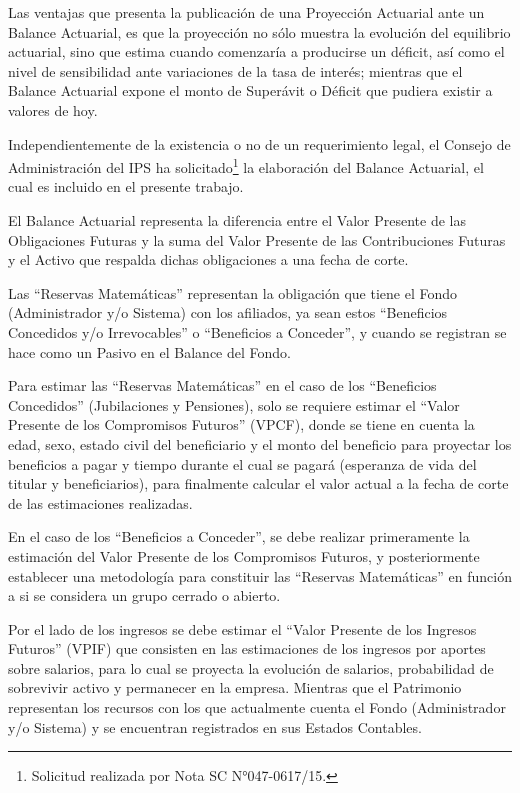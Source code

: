 \documentclass[a4paper,11pt]{article}
\begin{document}
Las ventajas que presenta la publicación de una Proyección Actuarial ante un Balance Actuarial, es que la proyección no sólo muestra la evolución del equilibrio actuarial, sino que estima cuando comenzaría a producirse un déficit, así como el nivel de sensibilidad ante variaciones de la tasa de interés; mientras que el Balance Actuarial expone el monto de Superávit o Déficit que pudiera existir a valores de hoy.

Independientemente de la existencia o no de un requerimiento legal, el Consejo de Administración del IPS ha solicitado\footnote{Solicitud realizada por Nota SC N°047-0617/15.}  la elaboración del Balance Actuarial, el cual es incluido en el presente trabajo.

El Balance Actuarial representa la diferencia entre el Valor Presente de las Obligaciones Futuras y la suma del Valor Presente de las Contribuciones Futuras y el Activo que respalda dichas obligaciones a una fecha de corte.  

Las “Reservas Matemáticas” representan la obligación que tiene el Fondo (Administrador y/o Sistema) con los afiliados, ya sean estos “Beneficios Concedidos y/o Irrevocables” o “Beneficios a Conceder”, y cuando se registran se hace como un Pasivo en el Balance del Fondo. 

Para estimar las “Reservas Matemáticas” en el caso de los “Beneficios Concedidos” (Jubilaciones y Pensiones), solo se requiere estimar el “Valor Presente de los Compromisos Futuros” (VPCF), donde se tiene en cuenta la edad, sexo, estado civil del beneficiario y el monto del beneficio para proyectar los beneficios a pagar y tiempo durante el cual se pagará (esperanza de vida del titular y beneficiarios), para finalmente calcular el valor actual a la fecha de corte de las estimaciones realizadas.

En el caso de los “Beneficios a Conceder”, se debe realizar primeramente la estimación del Valor Presente de los Compromisos Futuros, y posteriormente establecer una metodología para constituir las “Reservas Matemáticas” en función a si se considera un grupo cerrado o abierto.

Por el lado de los ingresos se debe estimar el “Valor Presente de los Ingresos Futuros” (VPIF) que consisten en las estimaciones de los ingresos por aportes sobre salarios, para lo cual se proyecta la evolución de salarios, probabilidad de sobrevivir activo y permanecer en la empresa.  Mientras que el Patrimonio representan los recursos con los que actualmente cuenta el Fondo (Administrador y/o Sistema) y se encuentran registrados en sus Estados Contables.
\end{document}
